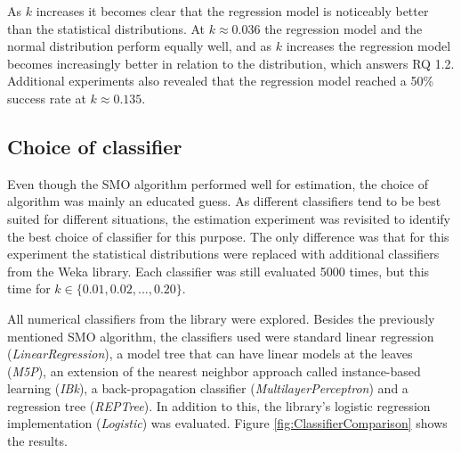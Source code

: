 \documentclass{sig-alternate}
\begin{document}
As \(k\) increases it becomes clear that the regression model is noticeably better than the statistical distributions. At \(k \approx 0.036\) the regression model and the normal distribution perform equally well, and as \(k\) increases the regression model becomes increasingly better in relation to the distribution, which answers RQ 1.2. Additional experiments also revealed that the regression model reached a 50\% success rate at \(k \approx 0.135\).

\subsection{Choice of classifier}
\label{ssec:Classifier}
Even though the SMO algorithm performed well for estimation, the choice of algorithm was mainly an educated guess. As  different classifiers tend to be best suited for different situations, the estimation experiment was revisited to identify the best choice of classifier for this purpose. The only difference was that for this experiment the statistical distributions were replaced with additional classifiers from the Weka library. Each classifier was still evaluated 5000 times, but this time for \(k \in \{0.01, 0.02, ..., 0.20\} \).

All numerical classifiers from the library were explored. Besides the previously mentioned SMO algorithm, the classifiers used were standard linear regression (\textit{LinearRegression}), a model tree that can have linear models at the leaves (\textit{M5P}), an extension of the nearest neighbor approach called instance-based learning (\textit{IBk}), a back-propagation classifier (\textit{MultilayerPerceptron}) and a regression tree (\textit{REPTree}). In addition to this, the library's logistic regression implementation (\textit{Logistic}) was evaluated. Figure \ref{fig:ClassifierComparison} shows the results.
\end{document}
